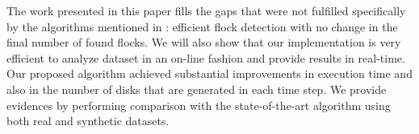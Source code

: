 The work presented in this paper fills the gaps that were not fulfilled specifically by the algorithms mentioned in
: efficient flock detection with no change in the final number of found flocks. We will also show
that our implementation is very efficient to analyze dataset in an on-line fashion and provide results in real-time. Our
proposed algorithm achieved substantial improvements in execution time and also in the number of disks that are
generated in each time step. We provide evidences by performing comparison with the state-of-the-art algorithm using
both real and synthetic datasets.
